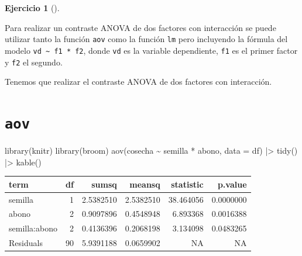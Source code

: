 \documentclass[
  a4paper,
]{scrreport}
\newenvironment{Shaded}{\begin{snugshade}}{\end{snugshade}}
\newcommand{\AttributeTok}[1]{\textcolor[rgb]{0.40,0.45,0.13}{#1}}
\newcommand{\FunctionTok}[1]{\textcolor[rgb]{0.28,0.35,0.67}{#1}}
\newcommand{\NormalTok}[1]{\textcolor[rgb]{0.00,0.23,0.31}{#1}}
\newcommand{\SpecialCharTok}[1]{\textcolor[rgb]{0.37,0.37,0.37}{#1}}
\theoremstyle{definition}
\newtheorem{exercise}{Ejercicio}[chapter]
\theoremstyle{remark}
\begin{document}
\begin{exercise}[]
\begin{enumerate}
\begin{tcolorbox}
  Para realizar un contraste ANOVA de dos factores con interacción se
  puede utilizar tanto la función \texttt{aov} como la función
  \texttt{lm} pero incluyendo la fórmula del modelo
  \texttt{vd\ \textasciitilde{}\ f1\ *\ f2}, donde \texttt{vd} es la
  variable dependiente, \texttt{f1} es el primer factor y \texttt{f2} el
  segundo.

  \end{tcolorbox}

  \begin{tcolorbox}[enhanced jigsaw, colframe=quarto-callout-tip-color-frame, toprule=.15mm, bottomtitle=1mm, breakable, opacitybacktitle=0.6, toptitle=1mm, colback=white, bottomrule=.15mm, title=\textcolor{quarto-callout-tip-color}{\faLightbulb}\hspace{0.5em}{Solución}, arc=.35mm, left=2mm, titlerule=0mm, rightrule=.15mm, coltitle=black, leftrule=.75mm, opacityback=0, colbacktitle=quarto-callout-tip-color!10!white]

  Tenemos que realizar el contraste ANOVA de dos factores con
  interacción.

  \section{\texorpdfstring{\texttt{aov}}{aov}}

\begin{Shaded}
\begin{Highlighting}[]
\FunctionTok{library}\NormalTok{(knitr)}
\FunctionTok{library}\NormalTok{(broom)}
\FunctionTok{aov}\NormalTok{(cosecha }\SpecialCharTok{\textasciitilde{}}\NormalTok{ semilla }\SpecialCharTok{*}\NormalTok{ abono, }\AttributeTok{data =}\NormalTok{ df) }\SpecialCharTok{|\textgreater{}} 
    \FunctionTok{tidy}\NormalTok{() }\SpecialCharTok{|\textgreater{}} 
    \FunctionTok{kable}\NormalTok{()}
\end{Highlighting}
\end{Shaded}

  \begin{longtable}[]{@{}lrrrrr@{}}
  \toprule\noalign{}
  term & df & sumsq & meansq & statistic & p.value \\
  \midrule\noalign{}
  \endhead
  \bottomrule\noalign{}
  \endlastfoot
  semilla & 1 & 2.5382510 & 2.5382510 & 38.464056 & 0.0000000 \\
  abono & 2 & 0.9097896 & 0.4548948 & 6.893368 & 0.0016388 \\
  semilla:abono & 2 & 0.4136396 & 0.2068198 & 3.134098 & 0.0483265 \\
  Residuals & 90 & 5.9391188 & 0.0659902 & NA & NA \\
  \end{longtable}


\end{tcolorbox}
\end{enumerate}
\end{exercise}
\end{document}
